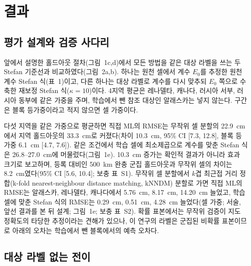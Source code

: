 
\section{결과}\label{sec:results}

\subsection{평가 설계와 검증 사다리}\label{sec:results-design}

앞에서 설명한 홀드아웃 절차(그림~1c,d)에서 모든 방법을 같은 대상 라벨을 쓰는 두 Stefan 기준선과 비교하였다(그림~2a,b). 하나는 원천 셀에서 계수 $E_0$를 추정한 원천 계수 Stefan 식(표~1)이고, 다른 하나는 대상 라벨로 계수를 다시 맞추되 $E_0$ 쪽으로 수축한 재보정 Stefan 식($\kappa = 10$)이다\cite{Steyerberg2004}.
4지역 평균은 레나델타, 캐나다, 러시아 서부, 러시아 동부에 같은 가중을 주며, 학습에서 뺀 참조 대상인 알래스카는 넣지 않는다.
구간은 블록 등가중이라고 적지 않으면 셀 가중이다.

다섯 지역을 같은 가중으로 평균하면 직접 ML의 RMSE는 무작위 셀 분할의 22.9~cm에서 지역 홀드아웃의 33.3~cm로 커졌다(차이 10.3~cm, 95\% CI [7.3, 12.8], 블록 등가중 6.1~cm [4.7, 7.6]). 같은 조건에서 학습 셀에 최소제곱으로 계수를 맞춘 Stefan 식은 26.8--27.0~cm에 머물렀다(그림~1e).
10.3~cm 증가는 확인적 결과가 아니라 효과 크기로 보고하며, 등록 대비인 500~km 완충 군집 홀드아웃과 무작위 셀의 차이는 8.2~cm였다(95\% CI [5.6, 10.4]; 보충 표~S1).
무작위 셀 분할에서 $k$겹 최근접 거리 정합(k-fold nearest-neighbour distance matching, kNNDM) 분할\cite{Linnenbrink2024}로 가면 직접 ML의 RMSE는 알래스카, 레나델타, 캐나다에서 5.76~cm, 8.17~cm, 14.20~cm 늘었고, 학습 셀에 맞춘 Stefan 식의 RMSE는 0.29~cm, 0.51~cm, 4.28~cm 늘었다(셀 가중; 서술, 앞선 결과를 본 뒤 설계; 그림~1e; 보충 표~S2).
확률 표본에서는 무작위 검증이 지도 정확도의 타당한 추정이라는 견해가 있으나\cite{Wadoux2021}, 이 연구의 라벨은 군집된 비확률 표본이므로 아래의 오차는 학습에서 뺀 블록에서의 예측 오차다.

\subsection{대상 라벨 없는 전이}\label{sec:results-label0}

